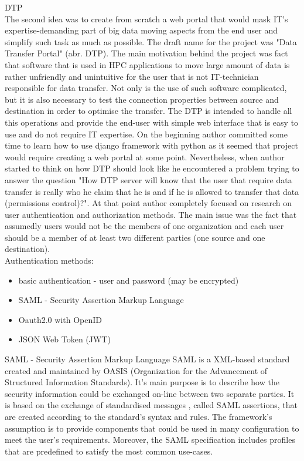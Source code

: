 \documentclass[magisterska,en]{pracamgr}
\begin{document}
\newpage
DTP\\
The second idea was to create from scratch a web portal that would mask IT's expertise-demanding part of big data moving aspects from the end user and simplify such task as much as possible. The draft name for the project was "Data Transfer Portal" (abr. DTP). The main motivation behind the project was fact that software that is used in HPC applications to move large amount of data is rather unfriendly and unintuitive for the user that is not IT-technician responsible for data transfer. Not only is the use of such software complicated, but it is also necessary to test the connection properties between source and destination in order to optimise the transfer. The DTP is intended to handle all this operations and provide the end-user with simple web interface that is easy to use and do not require IT expertise.
On the beginning author committed some time to learn how to use django framework with python \cite{djangotutorial} as it seemed that project would require creating a web portal at some point. 
Nevertheless, when author started to think on how DTP should look like he encountered a problem trying to answer the question "How DTP server will know that the user that require data transfer is really who he claim that he is and if he is allowed to transfer that data (permissions control)?". At that point author completely focused on research on user authentication and authorization methods. The main issue was the fact that assumedly users would not be the members of one organization and each user should be a member of at least two different parties (one source and one destination).\\

Authentication methods:\cite{auth_meth}

\begin{itemize}
 \item basic authentication - user and password (may be encrypted)
 \item SAML - Security Assertion Markup Language\cite{saml2}
 \item Oauth2.0\cite{OAuth2} with OpenID\cite{OpenID}
 \item JSON Web Token (JWT) \cite{jwt}
\end{itemize}


SAML - Security Assertion Markup Language
SAML is a XML-based standard created and maintained by OASIS (Organization for the Advancement of Structured Information Standards). It's main purpose is to describe how the security information could be exchanged on-line between two separate parties. It is based on the exchange of standardised messages , called SAML assertions, that are created according to the standard's syntax and rules. The framework's assumption is to provide components that could be used in many configuration to meet the user's requirements. Moreover, the SAML specification includes profiles that are predefined to satisfy the most common use-cases.\cite{saml2}
\end{document}
